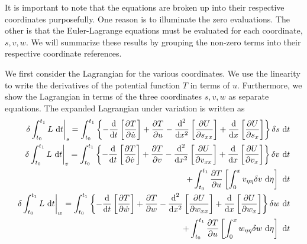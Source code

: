 It is important to note that the equations are broken up into their respective coordinates purposefully. One reason is to illuminate the zero evaluations. The other is that the Euler-Lagrange equations must be evaluated for each coordinate, $s,v,w$. We will summarize these results by grouping the non-zero terms into their respective coordinate references.

We first consider the Lagrangian for the various coordinates. We use the linearity to write the derivatives of the potential function $T$ in terms of $u$. Furthermore, we show the Lagrangian in terms of the three coordinates $s,v,w$ as separate equations. The expanded Lagrangian under variation is written as
\begin{eqnarray}
\left.\delta\int_{t_0}^{t_1}L\text{ d}t\right|_s = \int_{t_0}^{t_1}\left\lbrace-\frac{\text d}{\text dt}\left[\frac{\partial T}{\partial \dot u}\right]+\frac{\partial T}{\partial u} - \frac{\text d^2}{\text dx^2}\left[\frac{\partial U}{\partial s_{xx}}\right]+\frac{\text d}{\text dx}\left[\frac{\partial  U}{\partial s_{x}}\right]\right\rbrace\delta s\text{ d}t\\
\left.\delta\int_{t_0}^{t_1}L\text{ d}t\right|_v =\int_{t_0}^{t_1}\left\lbrace-\frac{\text d}{\text dt}\left[\frac{\partial T}{\partial \dot v}\right]+\frac{\partial T}{\partial v} - \frac{\text d^2}{\text dx^2}\left[\frac{\partial U}{\partial v_{xx}}\right]+\frac{\text d}{\text dx}\left[\frac{\partial  U}{\partial v_{x}}\right]\right\rbrace\delta v\text{ d}t\\
+\int_{t_0}^{t_1}\frac{\partial T}{\partial u}\left[\int_0^xv_{\eta\eta}\delta v\text{ d}\eta\right]\text{ d}t\nonumber\\
\left.\delta\int_{t_0}^{t_1}L\text{ d}t\right|_w =\int_{t_0}^{t_1}\left\lbrace-\frac{\text d}{\text dt}\left[\frac{\partial T}{\partial \dot w}\right]+\frac{\partial T}{\partial w} - \frac{\text d^2}{\text dx^2}\left[\frac{\partial U}{\partial w_{xx}}\right]+\frac{\text d}{\text dx}\left[\frac{\partial  U}{\partial w_{x}}\right]\right\rbrace\delta w\text{ d}t\\
+\int_{t_0}^{t_1}\frac{\partial T}{\partial u}\left[\int_0^xw_{\eta\eta}\delta w\text{ d}\eta\right]\text{ d}t\nonumber
\end{eqnarray}

